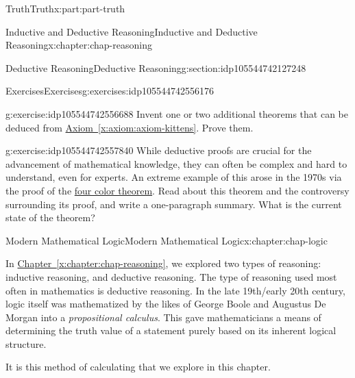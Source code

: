 \documentclass[oneside,10pt,]{book}
\newcommand{\xreffont}{\relax}
\numberwithin{equation}{section}
\begin{document}
\begin{partptx}{Truth}{}{Truth}{}{}{x:part:part-truth}
\begin{chapterptx}{Inductive and Deductive Reasoning}{}{Inductive and Deductive Reasoning}{}{}{x:chapter:chap-reasoning}
\begin{sectionptx}{Deductive Reasoning}{}{Deductive Reasoning}{}{}{g:section:idp105544742127248}
%
%
\typeout{************************************************}
\typeout{************************************************}
%
\begin{exercises-subsection-numberless}{Exercises}{}{Exercises}{}{}{g:exercises:idp105544742556176}
\begin{divisionexercise}{1}{}{}{g:exercise:idp105544742556688}%
Invent one or two additional theorems that can be deduced from \hyperref[x:axiom:axiom-kittens]{Axiom~{\xreffont\ref{x:axiom:axiom-kittens}}}. Prove them.%
\end{divisionexercise}%
\begin{divisionexercise}{2}{}{}{g:exercise:idp105544742557840}%
While deductive proofs are crucial for the advancement of mathematical knowledge, they can often be complex and hard to understand, even for experts. An extreme example of this arose in the 1970s via the proof of the \href{https://en.wikipedia.org/wiki/Four_color_theorem}{four color theorem}\footnotemark{}. Read about this theorem and the controversy surrounding its proof, and write a one-paragraph summary. What is the current state of the theorem?%
\end{divisionexercise}%
%
\end{exercises-subsection-numberless}
\end{sectionptx}
\end{chapterptx}
%
\typeout{************************************************}
\typeout{************************************************}
%
\begin{chapterptx}{Modern Mathematical Logic}{}{Modern Mathematical Logic}{}{}{x:chapter:chap-logic}
\begin{introduction}{}%
In \hyperref[x:chapter:chap-reasoning]{Chapter~{\xreffont\ref{x:chapter:chap-reasoning}}}, we explored two types of reasoning: inductive reasoning, and deductive reasoning. The type of reasoning used most often in mathematics is deductive reasoning. In the late 19th\slash{}early 20th century, logic itself was mathematized by the likes of George Boole and Augustus De Morgan into a \emph{propositional calculus}. This gave mathematicians a means of determining the truth value of a statement purely based on its inherent logical structure.%
\par
It is this method of calculating that we explore in this chapter.%
\end{introduction}%

\end{chapterptx}
\end{partptx}
\end{document}
